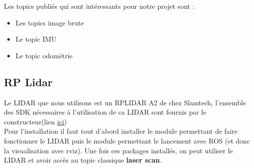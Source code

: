 \documentclass[french]{rapportENSTAB}
\begin{document}
Les topics publiés qui sont intéressants pour notre projet sont : \begin{itemize}[label=\textbullet, font=\small\color{blue}]
    \item Les topics image brute
    \item Le topic IMU
    \item Le topic odométrie 
\end{itemize}



\subsection{RP Lidar}
Le LIDAR que nous utilisons est un RPLIDAR A2 de chez Slamtech, l'ensemble des SDK nécessaires à l'utilisation de ca LIDAR sont fournis par le constructeur(lien \href{https://www.slamtec.com/en/Support#rplidar-a-series}{ici}) \\

Pour l'installation il faut tout d'abord installer le module permettant de faire fonctionner le LIDAR puis le module permettant le lancement avec ROS (et donc la visualisation avec rviz). Une fois ces packages installés, on peut utiliser le LIDAR et avoir accès au topic classique \textbf{laser scan}. \\
\\
\end{document}
